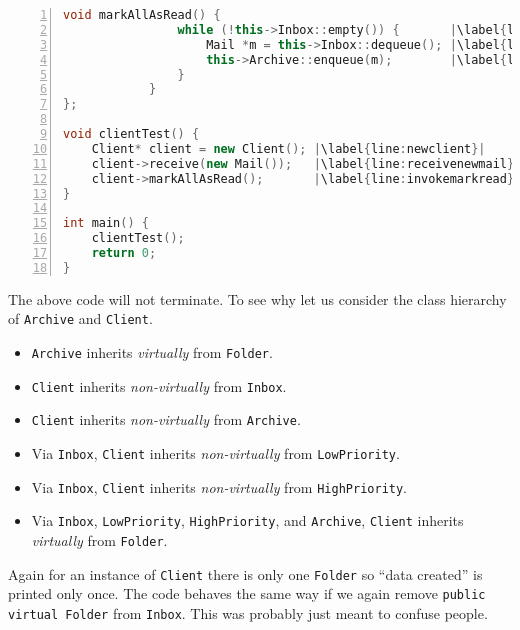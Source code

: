\documentclass{article}
\begin{document}
\begin{example}
\begin{lstlisting}[language=C++, numbers=left, escapechar=|]
            void markAllAsRead() {
                while (!this->Inbox::empty()) {       |\label{line:whilenotempty}|
                    Mail *m = this->Inbox::dequeue(); |\label{line:clientdequeue}|
                    this->Archive::enqueue(m);        |\label{line:clientenqueue}|
                }
            }
};

void clientTest() {
    Client* client = new Client(); |\label{line:newclient}|
    client->receive(new Mail());   |\label{line:receivenewmail}|
    client->markAllAsRead();       |\label{line:invokemarkread}|
}

int main() {
    clientTest();
    return 0;
}
\end{lstlisting}
  The above code will not terminate.
  To see why let us consider the class hierarchy of \texttt{Archive} and \texttt{Client}.
  \begin{itemize}
  \item \texttt{Archive} inherits \textit{virtually} from \texttt{Folder}.
  \item \texttt{Client} inherits \textit{non-virtually} from \texttt{Inbox}.
  \item \texttt{Client} inherits \textit{non-virtually} from \texttt{Archive}.
  \item Via \texttt{Inbox}, \texttt{Client} inherits \textit{non-virtually} from \texttt{LowPriority}.
  \item Via \texttt{Inbox}, \texttt{Client} inherits \textit{non-virtually} from \texttt{HighPriority}.
  \item Via \texttt{Inbox}, \texttt{LowPriority}, \texttt{HighPriority}, and \texttt{Archive}, \texttt{Client} inherits \textit{virtually} from \texttt{Folder}. 
  \end{itemize}
Again for an instance of \texttt{Client} there is only one \texttt{Folder} so ``data created'' is printed only once.
  The code behaves the same way if we again remove \texttt{public virtual Folder} from \texttt{Inbox}.
  This was probably just meant to confuse people.


\end{example}
\end{document}
